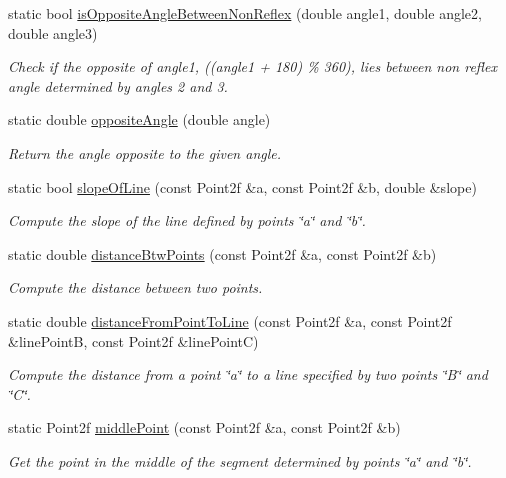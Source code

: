 \begin{DoxyCompactItemize}
static bool \hyperlink{classmultiscale_1_1Geometry2D_a28d74085708bba7fa68fbea05d0d51ad}{is\-Opposite\-Angle\-Between\-Non\-Reflex} (double angle1, double angle2, double angle3)
\begin{DoxyCompactList}\small\item\em Check if the opposite of angle1, ((angle1 + 180) \% 360), lies between non reflex angle determined by angles 2 and 3. \end{DoxyCompactList}\item 
static double \hyperlink{classmultiscale_1_1Geometry2D_a3bb85fa2797ba25765f0f57786cb33ef}{opposite\-Angle} (double angle)
\begin{DoxyCompactList}\small\item\em Return the angle opposite to the given angle. \end{DoxyCompactList}\item 
static bool \hyperlink{classmultiscale_1_1Geometry2D_a1219ac10c3647d43c5af77dc5bc574a2}{slope\-Of\-Line} (const Point2f \&a, const Point2f \&b, double \&slope)
\begin{DoxyCompactList}\small\item\em Compute the slope of the line defined by points \char`\"{}a\char`\"{} and \char`\"{}b\char`\"{}. \end{DoxyCompactList}\item 
static double \hyperlink{classmultiscale_1_1Geometry2D_a911b35d7abde99988bb4b43f00d6be72}{distance\-Btw\-Points} (const Point2f \&a, const Point2f \&b)
\begin{DoxyCompactList}\small\item\em Compute the distance between two points. \end{DoxyCompactList}\item 
static double \hyperlink{classmultiscale_1_1Geometry2D_ae6c0f66accf4ecf31b0fd96437371626}{distance\-From\-Point\-To\-Line} (const Point2f \&a, const Point2f \&line\-Point\-B, const Point2f \&line\-Point\-C)
\begin{DoxyCompactList}\small\item\em Compute the distance from a point \char`\"{}a\char`\"{} to a line specified by two points \char`\"{}\-B\char`\"{} and \char`\"{}\-C\char`\"{}. \end{DoxyCompactList}\item 
static Point2f \hyperlink{classmultiscale_1_1Geometry2D_a178c13bdb5cc3f26de7d5e9fd05781f5}{middle\-Point} (const Point2f \&a, const Point2f \&b)
\begin{DoxyCompactList}\small\item\em Get the point in the middle of the segment determined by points \char`\"{}a\char`\"{} and \char`\"{}b\char`\"{}. \end{DoxyCompactList}\item 

\end{DoxyCompactItemize}
